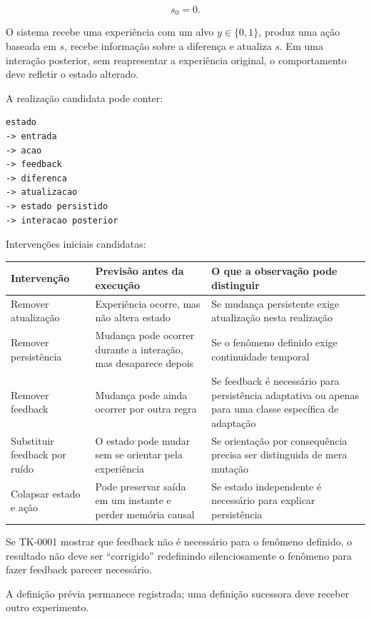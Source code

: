 \documentclass[11pt,a4paper]{article}
\begin{document}
\[
s_0=0.
\]

O sistema recebe uma experiência com um alvo \(y\in\{0,1\}\), produz uma ação baseada
em \(s\), recebe informação sobre a diferença e atualiza \(s\). Em uma interação
posterior, sem reapresentar a experiência original, o comportamento deve refletir o
estado alterado.

A realização candidata pode conter:

\begin{lstlisting}
estado
-> entrada
-> acao
-> feedback
-> diferenca
-> atualizacao
-> estado persistido
-> interacao posterior
\end{lstlisting}

Intervenções iniciais candidatas:

\begin{longtable}{p{4.1cm}p{5.0cm}p{5.0cm}}
\toprule
Intervenção & Previsão antes da execução & O que a observação pode distinguir \\
\midrule
\endhead
Remover atualização &
Experiência ocorre, mas não altera estado &
Se mudança persistente exige atualização nesta realização \\

Remover persistência &
Mudança pode ocorrer durante a interação, mas desaparece depois &
Se o fenômeno definido exige continuidade temporal \\

Remover feedback &
Mudança pode ainda ocorrer por outra regra &
Se feedback é necessário para persistência adaptativa ou apenas para uma classe
específica de adaptação \\

Substituir feedback por ruído &
O estado pode mudar sem se orientar pela experiência &
Se orientação por consequência precisa ser distinguida de mera mutação \\

Colapsar estado e ação &
Pode preservar saída em um instante e perder memória causal &
Se estado independente é necessário para explicar persistência \\
\bottomrule
\end{longtable}

\begin{falsifybox}
Se TK-0001 mostrar que feedback não é necessário para o fenômeno definido, o resultado
não deve ser ``corrigido'' redefinindo silenciosamente o fenômeno para fazer feedback
parecer necessário.

A definição prévia permanece registrada; uma definição sucessora deve receber outro
experimento.
\end{falsifybox}
\end{document}
